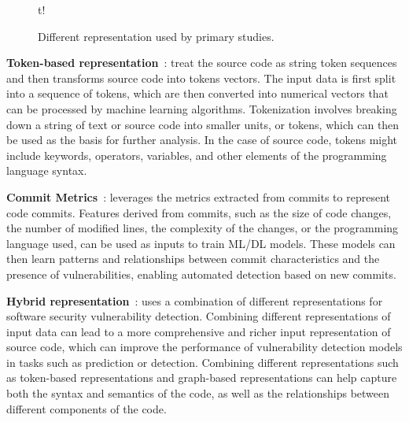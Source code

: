 \begin{figure}{t!}
  \centering
  \caption{Different representation used by primary studies.}
  \label{fig:representationDist}
\end{figure}%

\noindent \textbf{Token-based representation}~\cite{aivatoglou2021tree, zhou2017automated, russell2018automated, dam2018automatic, yamaguchi2013chucky, du2020cross, nguyen2020deep, liu2019deepbalance, pradel2018deepbugs, le2021deepcva, hoang2019deepjit}: treat the source code as string token sequences and then transforms source code into tokens vectors. The input data is first split into a sequence of tokens, which are then converted into numerical vectors that can be processed by machine learning algorithms. Tokenization involves breaking down a string of text or source code into smaller units, or tokens, which can then be used as the basis for further analysis. In the case of source code, tokens might include keywords, operators, variables, and other elements of the programming language syntax.


\noindent \textbf{Commit Metrics}~\cite{ni2022best, Vuldiggerpaper, pascarella2019fine}: 
leverages the metrics extracted from commits to represent code commits. Features derived from commits, such as the size of code changes, the number of modified lines, the complexity of the changes, or the programming language used, can be used as inputs to train ML/DL models. These models can then learn patterns and relationships between commit characteristics and the presence of vulnerabilities, enabling automated detection based on new commits.

\noindent \textbf{Hybrid representation}~\cite{russell2018automated, wang2020combining, le2021deepcva, cheng2021deepwukong, sabetta2018practical, hoang2019deepjit, zhou2017automated, chen2020machine}: uses a combination of different representations for software security vulnerability detection. Combining different representations of input data can lead to a more comprehensive and richer input representation of source code, which can improve the performance of vulnerability detection models in tasks such as prediction or detection. Combining different representations such as token-based representations and graph-based representations can help capture both the syntax and semantics of the code, as well as the relationships between different components of the code.



